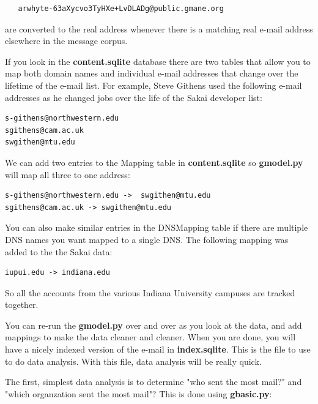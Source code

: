 \documentclass[11pt]{book}
\begin{document}
\beforeverb
\begin{verbatim}
   arwhyte-63aXycvo3TyHXe+LvDLADg@public.gmane.org
\end{verbatim}
\afterverb
%
are converted to the real address whenever there is a matching real e-mail
address elsewhere in the message corpus.

If you look in the {\bf content.sqlite} database there are two tables that allow
you to map both domain names and individual e-mail addresses that change over 
the lifetime of the e-mail list.  For example, Steve Githens used the following
e-mail addresses as he changed jobs over the life of the Sakai developer list:

\beforeverb
\begin{verbatim}
s-githens@northwestern.edu
sgithens@cam.ac.uk
swgithen@mtu.edu
\end{verbatim}
\afterverb
%
We can add two entries to the Mapping table in {\bf content.sqlite} so 
{\bf gmodel.py} will map all three to one address:

\beforeverb
\begin{verbatim}
s-githens@northwestern.edu ->  swgithen@mtu.edu
sgithens@cam.ac.uk -> swgithen@mtu.edu
\end{verbatim}
\afterverb
%
You can also make similar entries in the DNSMapping table if there are multiple
DNS names you want mapped to a single DNS.  The following mapping was added to the the Sakai data:

\beforeverb
\begin{verbatim}
iupui.edu -> indiana.edu
\end{verbatim}
\afterverb
%
So all the accounts from the various Indiana University campuses are tracked together.

You can re-run the {\bf gmodel.py} over and over as you look at the data, and add mappings
to make the data cleaner and cleaner.   When you are done, you will have a nicely
indexed version of the e-mail in {\bf index.sqlite}.   This is the file to use to do data
analysis.   With this file, data analysis will be really quick.

The first, simplest data analysis is to determine "who sent the most mail?" and "which 
organzation sent the most mail"?  This is done using {\bf gbasic.py}:
\end{document}
